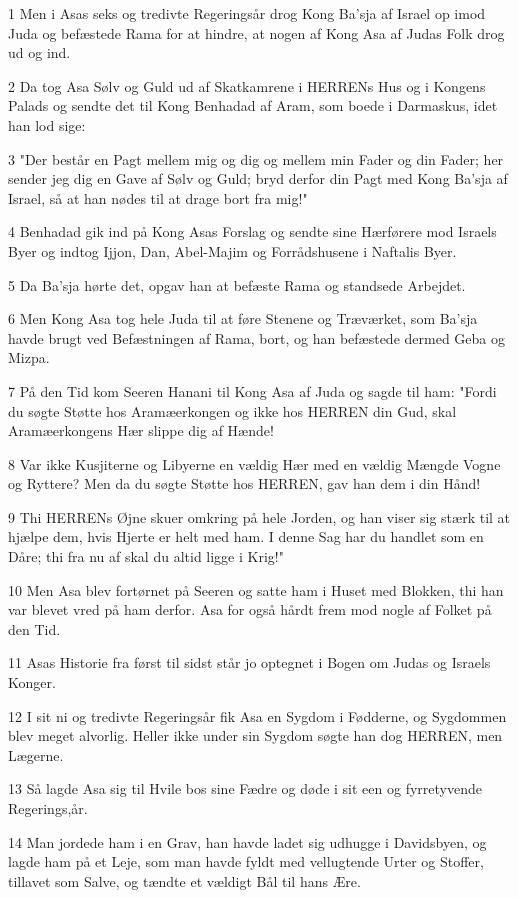 \par 1 Men i Asas seks og tredivte Regeringsår drog Kong Ba'sja af Israel op imod Juda og befæstede Rama for at hindre, at nogen af Kong Asa af Judas Folk drog ud og ind.
\par 2 Da tog Asa Sølv og Guld ud af Skatkamrene i HERRENs Hus og i Kongens Palads og sendte det til Kong Benhadad af Aram, som boede i Darmaskus, idet han lod sige:
\par 3 "Der består en Pagt mellem mig og dig og mellem min Fader og din Fader; her sender jeg dig en Gave af Sølv og Guld; bryd derfor din Pagt med Kong Ba'sja af Israel, så at han nødes til at drage bort fra mig!"
\par 4 Benhadad gik ind på Kong Asas Forslag og sendte sine Hærførere mod Israels Byer og indtog Ijjon, Dan, Abel-Majim og Forrådshusene i Naftalis Byer.
\par 5 Da Ba'sja hørte det, opgav han at befæste Rama og standsede Arbejdet.
\par 6 Men Kong Asa tog hele Juda til at føre Stenene og Træværket, som Ba'sja havde brugt ved Befæstningen af Rama, bort, og han befæstede dermed Geba og Mizpa.
\par 7 På den Tid kom Seeren Hanani til Kong Asa af Juda og sagde til ham: "Fordi du søgte Støtte hos Aramæerkongen og ikke hos HERREN din Gud, skal Aramæerkongens Hær slippe dig af Hænde!
\par 8 Var ikke Kusjiterne og Libyerne en vældig Hær med en vældig Mængde Vogne og Ryttere? Men da du søgte Støtte hos HERREN, gav han dem i din Hånd!
\par 9 Thi HERRENs Øjne skuer omkring på hele Jorden, og han viser sig stærk til at hjælpe dem, hvis Hjerte er helt med ham. I denne Sag har du handlet som en Dåre; thi fra nu af skal du altid ligge i Krig!"
\par 10 Men Asa blev fortørnet på Seeren og satte ham i Huset med Blokken, thi han var blevet vred på ham derfor. Asa for også hårdt frem mod nogle af Folket på den Tid.
\par 11 Asas Historie fra først til sidst står jo optegnet i Bogen om Judas og Israels Konger.
\par 12 I sit ni og tredivte Regeringsår fik Asa en Sygdom i Fødderne, og Sygdommen blev meget alvorlig. Heller ikke under sin Sygdom søgte han dog HERREN, men Lægerne.
\par 13 Så lagde Asa sig til Hvile bos sine Fædre og døde i sit een og fyrretyvende Regerings,år.
\par 14 Man jordede ham i en Grav, han havde ladet sig udhugge i Davidsbyen, og lagde ham på et Leje, som man havde fyldt med vellugtende Urter og Stoffer, tillavet som Salve, og tændte et vældigt Bål til hans Ære.

